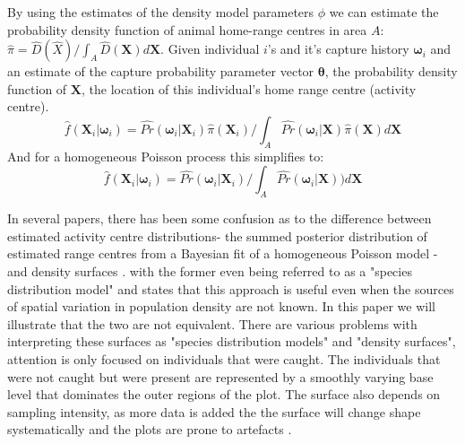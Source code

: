 \documentclass[a4paper,12pt]{article}
\begin{document}




By using the estimates of the density model parameters $\phi$ we can estimate the probability density function of animal home-range centres in area $A$: $\hat{\pi}=\hat{D}(\hat{X})/\int_{A} \hat{D}(\bm{X}) d\bm{X}$. Given individual $i$'s and it's capture history $\bm{\omega}_i$ and an estimate of the capture probability parameter vector $\bm{\theta}$, the probability density function of $\bm{X}$, the location of this individual's home range centre (activity centre). 
$$\hat{f}(\bm{X}_{i} | \bm{\omega}_{i}) = \widehat{Pr}(\bm{\omega}_{i} | \bm{X}_{i})\hat{\pi}(\bm{X}_{i})/\int_{A} \widehat{Pr}(\bm{\omega}_{i} | \bm{X})\hat{\pi}(\bm{X})d\bm{X}$$
And for a homogeneous Poisson process this simplifies to: $$\hat{f}(\bm{X}_{i} | \bm{\omega}_{i}) = \widehat{Pr}(\bm{\omega}_{i} | \bm{X}_{i})/ \int_{A} \widehat{Pr}(\bm{\omega}_{i} | \bm{X}))d\bm{X}$$

In several papers, there has been some confusion as to the difference between estimated activity centre distributions- the summed posterior distribution of estimated range centres from a Bayesian fit of a homogeneous Poisson model - and density surfaces \citep*{Dorazio2017, Kendall2016, Sollmann2011, Royle2009}. with the former even being referred to as a "species distribution model" \citep*{Dorazio2017} and states that this approach is useful even when the sources of spatial variation in population density are not known. In this paper we will illustrate that the two are not equivalent. There are various problems with interpreting these surfaces as "species distribution models" and "density surfaces", attention is only focused on individuals that were caught. The individuals that were not caught but were present are represented by a smoothly varying base level that dominates the outer regions of the plot. The surface also depends on sampling intensity, as more data is added the the surface will change shape systematically and the plots are prone to artefacts \citep*{Efford}.
\end{document}
